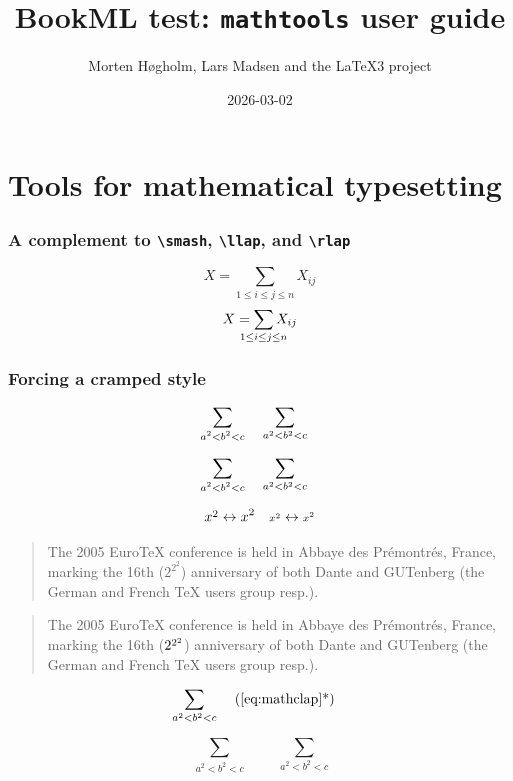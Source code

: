 \documentclass{article}
\title{BookML test: \texttt{mathtools} user guide}
\author{Morten Høgholm, Lars Madsen and the \LaTeX3 project}
\date{2026-03-02}
\begin{document}
\section{Tools for mathematical typesetting}

\subsubsection{A complement to \texttt{\textbackslash smash},
  \texttt{\textbackslash llap}, and \texttt{\textbackslash rlap}}

\[
  X = \sum_{1\le i\le j\le n} X_{ij}
\]
\[
  X = \sum_{\mathclap{1\le i\le j\le n}} X_{ij}
\]

\subsubsection{Forcing a cramped style}

\begin{equation}\label{eq:mathclap}
  \sum_{\mathclap{a^2<b^2<c}}\qquad
  \sum_{a^2<b^2<c}
\end{equation}

\begingroup \fontsize{24}{\baselineskip}\selectfont
\[
  \sum_{\mathclap{a^2<b^2<c}}\qquad
  \sum_{a^2<b^2<c}
\]
\endgroup

\[
  \cramped{x^2}               \leftrightarrow x^2    \quad
  \cramped[\scriptstyle]{x^2} \leftrightarrow {\scriptstyle x^2}
\]

\begin{quote}
  The 2005 Euro\TeX{} conference is held in Abbaye des
  Pr\'emontr\'es, France, marking the 16th ($2^{2^2}$) anniversary
  of both Dante and GUTenberg (the German and French \TeX{} users
  group resp.).
\end{quote}


\begin{quote}
  The 2005 Euro\TeX{} conference is held in Abbaye des
  Pr\'emontr\'es, France, marking the 16th ($\cramped{2^{2^2}}$)
  anniversary of both Dante and GUTenberg (the German and French
  \TeX{} users group resp.).
\end{quote}

\begin{equation*}\label{eq:mathclap-b}
  \sum_{\crampedclap{a^2<b^2<c}}
  \tag{\ref{eq:mathclap}*}
\end{equation*}

\begingroup \fontsize{24}{\baselineskip}\selectfont
\[
  \sum_{\substack{a^2<b^2<c}}\qquad
  \sum_{a^2<b^2<c}
\]
\endgroup
\end{document}
